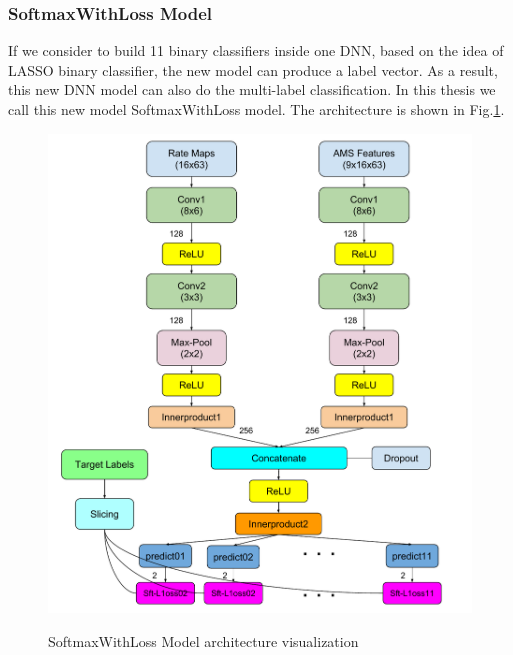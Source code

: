 \subsubsection{SoftmaxWithLoss Model}
If we consider to build 11 binary classifiers inside one DNN, based on the idea of LASSO binary classifier, the new model can produce a label vector. As a result, this new DNN model can also do the multi-label classification. In this thesis we call this new model SoftmaxWithLoss model. The architecture is shown in Fig.\ref{fig:slicing}. 
\begin{figure}[h!]
	\includegraphics[scale=0.5]{../image/chapter2/Architecture2.pdf}
	\label{fig:slicing}
	\caption{SoftmaxWithLoss Model architecture visualization}
\end{figure}
